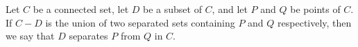 Let $C$ be a connected set, let $D$ be a subset of $C$, and let $P$ and $Q$ be points of $C$. If $C - D$ is the union of two separated sets containing $P$ and $Q$ respectively, then we say that $D$ separates $P$ from $Q$ in $C$.
